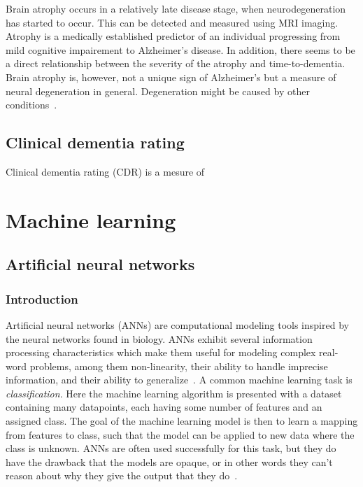 \documentclass{kththesis}
\begin{document}
Brain atrophy occurs in a relatively late disease stage, when neurodegeneration has started to occur. This can be detected and measured using MRI imaging. Atrophy is a medically established predictor of an individual progressing from mild cognitive impairement to Alzheimer's disease. In addition, there seems to be a direct relationship between the severity of the atrophy and time-to-dementia. Brain atrophy is, however, not a unique sign of Alzheimer's but a measure of neural degeneration in general. Degeneration might be caused by other conditions~\cite{jack2010brain}.

\subsection{Clinical dementia rating}
Clinical dementia rating (CDR) is a mesure of

\section{Machine learning}
\subsection{Artificial neural networks}
\subsubsection{Introduction}
Artificial neural networks (ANNs) are computational modeling tools inspired by the neural networks found in biology. ANNs exhibit several information processing characteristics which make them useful for modeling complex real-word problems, among them non-linearity, their ability to handle imprecise information, and their ability to generalize~\cite{ANNFundamentals}. A common machine learning task is \textit{classification}. Here the machine learning algorithm is presented with a dataset containing many datapoints, each having some number of features and an assigned class. The goal of the machine learning model is then to learn a mapping from features to class, such that the model can be applied to new data where the class is unknown. ANNs are often used successfully for this task, but they do have the drawback that the models are opaque, or in other words they can't reason about why they give the output that they do~\cite[p. 3, 8--9]{weiss1990empirical}.
\end{document}
